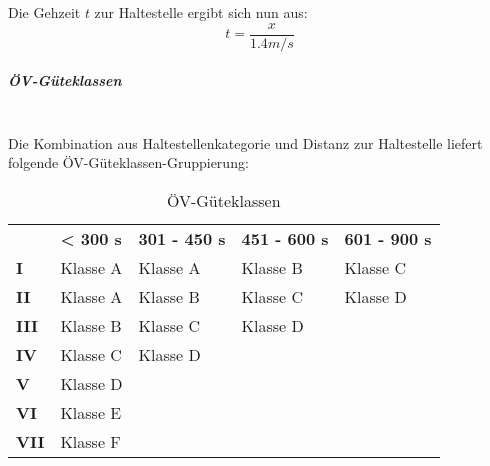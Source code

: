Die Gehzeit $t$ zur Haltestelle ergibt sich nun aus:
\[ t = \frac{x}{1.4 m/s} \]


\subparagraph{ÖV-Güteklassen}~\\
\label{Berechnungsmethodik OeVGK18:ÖV-Güteklassen}
Die Kombination aus Haltestellenkategorie und Distanz zur Haltestelle liefert folgende \acs{ÖV}-Güteklassen-Gruppierung:

\begin{table}[H]
    \begin{tabular}[c]{l p{3.3cm} p{3.3cm} p{3.3cm} p{3.3cm}}
        \midrule
        \textbf{}
                                & \textbf{< 300 s}
                                & \textbf{301 - 450 s}
                                & \textbf{451 - 600 s}
                                & \textbf{601 - 900 s}\\
        \textbf{I}
                                & Klasse A
                                & Klasse A
                                & Klasse B
                                & Klasse C\\
        \textbf{II}
                                & Klasse A
                                & Klasse B
                                & Klasse C
                                & Klasse D\\
        \textbf{III}
                                & Klasse B
                                & Klasse C
                                & Klasse D
                                &\\
        \textbf{IV}
                                & Klasse C
                                & Klasse D
                                &
                                &\\
        \textbf{V}
                                & Klasse D
                                &
                                &
                                &\\
        \textbf{VI}
                                & Klasse E
                                &
                                &
                                &\\
        \textbf{VII}
                                & Klasse F
                                &
                                &
                                &\\                                
        \bottomrule
    \end{tabular}
    \caption{ÖV-Güteklassen}
    \label{table:ÖV-Güteklassen}
\end{table}
